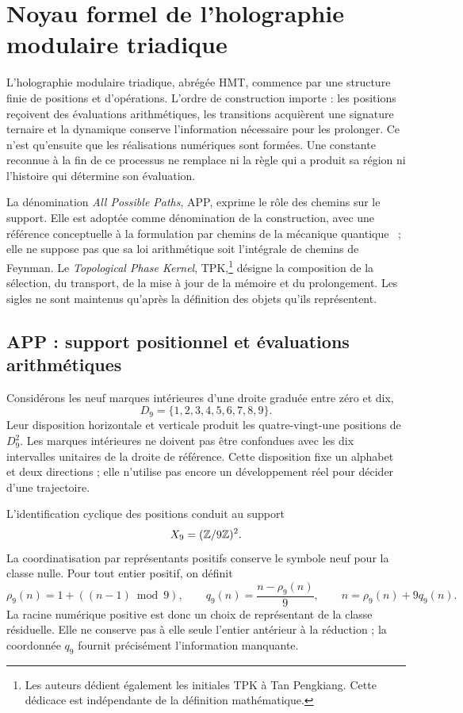 \section{Noyau formel de l'holographie modulaire triadique}
\label{sec:nucleo}

L'holographie modulaire triadique, abrégée HMT, commence par une structure finie de positions et d'opérations. L'ordre de construction importe : les positions reçoivent des évaluations arithmétiques, les transitions acquièrent une signature ternaire et la dynamique conserve l'information nécessaire pour les prolonger. Ce n'est qu'ensuite que les réalisations numériques sont formées. Une constante reconnue à la fin de ce processus ne remplace ni la règle qui a produit sa région ni l'histoire qui détermine son évaluation.

La dénomination \emph{All Possible Paths}, APP, exprime le rôle des chemins sur le support. Elle est adoptée comme dénomination de la construction, avec une référence conceptuelle à la formulation par chemins de la mécanique quantique~\cite{feynman1948} ; elle ne suppose pas que sa loi arithmétique soit l'intégrale de chemins de Feynman. Le \emph{Topological Phase Kernel}, TPK,\footnote{Les auteurs dédient également les initiales TPK à Tan Pengkiang. Cette dédicace est indépendante de la définition mathématique.} désigne la composition de la sélection, du transport, de la mise à jour de la mémoire et du prolongement. Les sigles ne sont maintenus qu'après la définition des objets qu'ils représentent.

\subsection{APP : support positionnel et évaluations arithmétiques}

Considérons les neuf marques intérieures d'une droite graduée entre zéro et dix,
\[
 D_9=\{1,2,3,4,5,6,7,8,9\}.
\]
Leur disposition horizontale et verticale produit les quatre-vingt-une positions de \(D_9^2\). Les marques intérieures ne doivent pas être confondues avec les dix intervalles unitaires de la droite de référence. Cette disposition fixe un alphabet et deux directions ; elle n'utilise pas encore un développement réel pour décider d'une trajectoire.

L'identification cyclique des positions conduit au support
\[
 X_9=(\mathbb Z/9\mathbb Z)^2.
\]
La coordinatisation par représentants positifs conserve le symbole neuf pour la classe nulle. Pour tout entier positif, on définit
\begin{equation}
 \rho_9(n)=1+((n-1)\bmod9),\qquad
 q_9(n)=\frac{n-\rho_9(n)}9,
 \qquad n=\rho_9(n)+9q_9(n).
 \label{eq:residuo-cociente}
\end{equation}
La racine numérique positive est donc un choix de représentant de la classe résiduelle. Elle ne conserve pas à elle seule l'entier antérieur à la réduction ; la coordonnée \(q_9\) fournit précisément l'information manquante.

